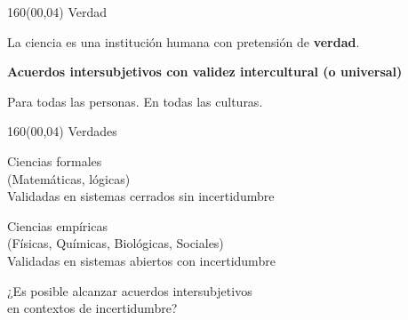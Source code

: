 \documentclass[shownotes,aspectratio=169]{beamer}
\begin{document}
\begin{frame}[plain]
\begin{textblock}{160}(00,04)
\centering
\LARGE Verdad
\end{textblock}
\vspace{2cm} \large

\centering

 La ciencia es una institución humana con pretensión de \textbf{verdad}. \\[0.1cm] \pause

\textbf{Acuerdos intersubjetivos con validez intercultural (o universal)}


\vspace{1cm}
\pause

Para todas las personas. En todas las culturas.

\end{frame}


\begin{frame}[plain]
\begin{textblock}{160}(00,04)
\centering
\LARGE Verdades
\end{textblock}
\vspace{1cm} \large

\centering

 \Large Ciencias formales \\
 \normalsize \textcolor{black!50}{(Matemáticas, lógicas)} \\
 \large  Validadas en sistemas cerrados sin incertidumbre\\

 \vspace{0.7cm}

  \pause

 \Large Ciencias empíricas \\
\normalsize  \textcolor{black!50}{(Físicas, Químicas, Biológicas, Sociales)} \\
\large Validadas en sistemas abiertos con incertidumbre

\pause
\vspace{0.6cm}

¿Es posible alcanzar acuerdos intersubjetivos \\ en contextos de incertidumbre?
%
%
%

\end{frame}
\end{document}
